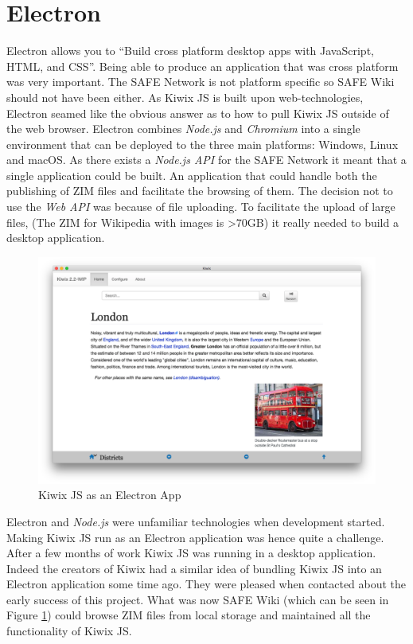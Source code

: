 \section{Electron}

Electron allows you to ``Build cross platform desktop apps with JavaScript, HTML, and CSS''. Being able to produce an application that was cross platform was very important. The SAFE Network is not platform specific so SAFE Wiki should not have been either. As Kiwix JS is built upon web-technologies, Electron seamed like the obvious answer as to how to pull Kiwix JS outside of the web browser. Electron combines \textit{Node.js} and \textit{Chromium} into a single environment that can be deployed to the three main platforms: Windows, Linux and macOS. As there exists a \textit{Node.js API} for the SAFE Network it meant that a single application could be built. An application that could handle both the publishing of ZIM files and facilitate the browsing of them. The decision not to use the \textit{Web API} was because of file uploading. To facilitate the upload of large files, (The ZIM for Wikipedia with images is \textgreater 70GB) it really needed to build a desktop application.

\begin{figure}[h]
	\begin{center}
		\includegraphics[width=\textwidth]{images/kiwix-js-electron}
		\caption{Kiwix JS as an Electron App}
		\label{fig:kiwix-js-electron}
	\end{center}
\end{figure}

Electron and \textit{Node.js} were unfamiliar technologies when development started. Making Kiwix JS run as an Electron application was hence quite a challenge. After a few months of work Kiwix JS was running in a desktop application. Indeed the creators of Kiwix had a similar idea of bundling Kiwix JS into an Electron application some time ago. They were pleased when contacted about the early success of this project. What was now SAFE Wiki (which can be seen in Figure \ref{fig:kiwix-js-electron}) could browse ZIM files from local storage and maintained all the functionality of Kiwix JS.

